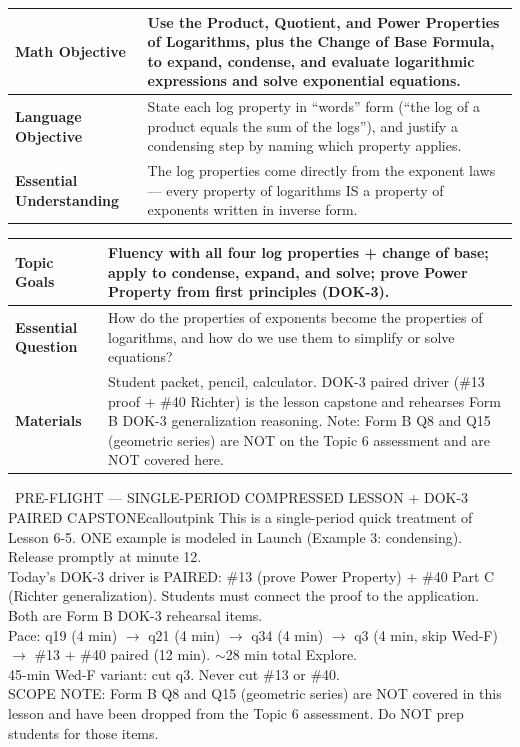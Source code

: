 \documentclass[11pt]{article}
\newcommand{\lessonrow}[2]{\textbf{#1} & #2 \\ \hline}
\begin{document}

{\small
\renewcommand{\arraystretch}{1.25}
\noindent\begin{tabular}{|p{1.8in}|p{4.8in}|}
\hline
\lessonrow{Math Objective}{Use the Product, Quotient, and Power Properties of Logarithms, plus the Change of Base Formula, to expand, condense, and evaluate logarithmic expressions and solve exponential equations.}
\lessonrow{Language Objective}{State each log property in ``words'' form (``the log of a product equals the sum of the logs''), and justify a condensing step by naming which property applies.}
\lessonrow{Essential Understanding}{The log properties come directly from the exponent laws --- every property of logarithms IS a property of exponents written in inverse form.}
\end{tabular}
}

{\small
\renewcommand{\arraystretch}{1.25}
\noindent\begin{tabular}{|p{1.8in}|p{4.8in}|}
\hline
\lessonrow{Topic Goals}{Fluency with all four log properties + change of base; apply to condense, expand, and solve; prove Power Property from first principles (DOK-3).}
\lessonrow{Essential Question}{How do the properties of exponents become the properties of logarithms, and how do we use them to simplify or solve equations?}
\lessonrow{Materials}{Student packet, pencil, calculator. DOK-3 paired driver (\#13 proof + \#40 Richter) is the lesson capstone and rehearses Form B DOK-3 generalization reasoning. Note: Form B Q8 and Q15 (geometric series) are NOT on the Topic 6 assessment and are NOT covered here.}
\end{tabular}
}

\begin{callout}{\IconPin\ PRE-FLIGHT --- SINGLE-PERIOD COMPRESSED LESSON + DOK-3 PAIRED CAPSTONE}{calloutpink}
This is a single-period quick treatment of Lesson 6-5. ONE example is modeled in Launch (Example 3: condensing). Release promptly at minute 12.\\
Today's DOK-3 driver is PAIRED: \#13 (prove Power Property) + \#40 Part C (Richter generalization). Students must connect the proof to the application. Both are Form B DOK-3 rehearsal items.\\
Pace: q19 (4 min) \(\rightarrow\) q21 (4 min) \(\rightarrow\) q34 (4 min) \(\rightarrow\) q3 (4 min, skip Wed-F) \(\rightarrow\) \#13 + \#40 paired (12 min). \(\sim\)28 min total Explore.\\
45-min Wed-F variant: cut q3. Never cut \#13 or \#40.\\
SCOPE NOTE: Form B Q8 and Q15 (geometric series) are NOT covered in this lesson and have been dropped from the Topic 6 assessment. Do NOT prep students for those items.
\end{callout}
\end{document}
